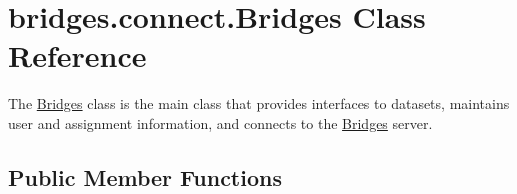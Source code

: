 \hypertarget{classbridges_1_1connect_1_1_bridges}{}\section{bridges.\+connect.\+Bridges Class Reference}
\label{classbridges_1_1connect_1_1_bridges}


The \mbox{\hyperlink{classbridges_1_1connect_1_1_bridges}{Bridges}} class is the main class that provides interfaces to datasets, maintains user and assignment information, and connects to the \mbox{\hyperlink{classbridges_1_1connect_1_1_bridges}{Bridges}} server.  


\subsection*{Public Member Functions}
